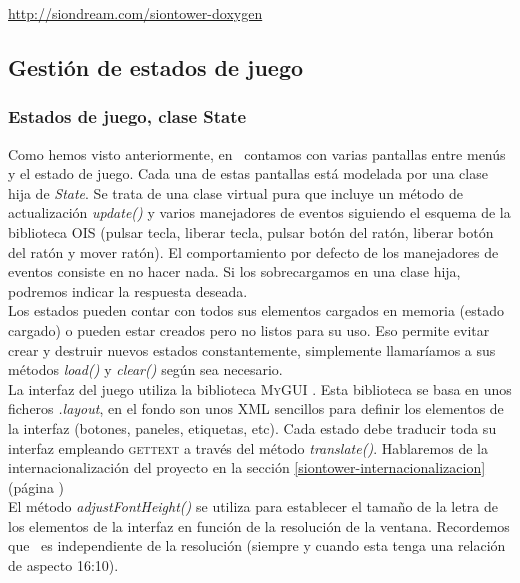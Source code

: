 \url{http://siondream.com/siontower-doxygen}\\

\subsection{Gestión de estados de juego}

\subsubsection{Estados de juego, clase State}

Como hemos visto anteriormente, en \juego\ contamos con varias pantallas
entre menús y el estado de juego. Cada una de estas pantallas está modelada
por una clase hija de \textit{State}. Se trata de una clase virtual pura
que incluye un método de actualización \textit{update()} y varios manejadores
de eventos siguiendo el esquema de la biblioteca \textsc{OIS} \cite{website:ois} (pulsar
tecla, liberar tecla, pulsar botón del ratón, liberar botón del ratón 
y mover ratón). El comportamiento por defecto de los manejadores de eventos
consiste en no hacer nada. Si los sobrecargamos en una clase hija, podremos
indicar la respuesta deseada.\\

Los estados pueden contar con todos sus elementos cargados en memoria (estado
cargado) o pueden estar creados pero no listos para su uso. Eso permite
evitar crear y destruir nuevos estados constantemente, simplemente llamaríamos
a sus métodos \textit{load()} y \textit{clear()} según sea necesario.\\

La interfaz del juego utiliza la biblioteca \textsc{MyGUI} \cite{website:mygui}.
Esta biblioteca se basa en unos ficheros \textit{.layout}, en el fondo
son unos XML sencillos para definir los elementos de la interfaz (botones,
paneles, etiquetas, etc). Cada estado debe traducir toda su interfaz
empleando \textsc{gettext} \cite{website:gettext} a través del método
\textit{translate()}. Hablaremos de la internacionalización del proyecto
en la sección \ref{siontower-internacionalizacion} (página \pageref{siontower-internacionalizacion})\\

El método \textit{adjustFontHeight()} se utiliza para establecer el tamaño
de la letra de los elementos de la interfaz en función de la resolución
de la ventana. Recordemos que \juego\ es independiente de la resolución
(siempre y cuando esta tenga una relación de aspecto 16:10).\\


